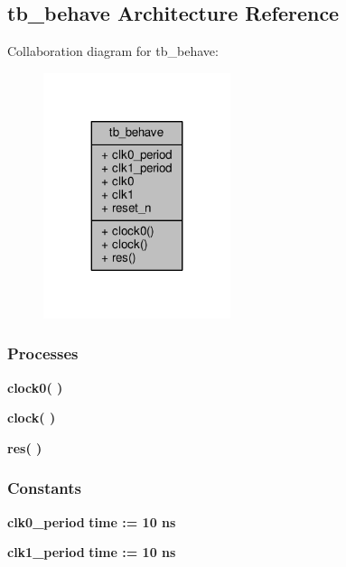 \subsection{tb\+\_\+behave Architecture Reference}
\label{classLTE__rx__path__tb_1_1tb__behave}


Collaboration diagram for tb\+\_\+behave\+:\nopagebreak
\begin{figure}[H]
\begin{center}
\leavevmode
\includegraphics[width=155pt]{d8/d33/classLTE__rx__path__tb_1_1tb__behave__coll__graph}
\end{center}
\end{figure}
\subsubsection*{Processes}
 \begin{DoxyCompactItemize}
\item 
{\bf clock0}{\bfseries  (  )}
\item 
{\bf clock}{\bfseries  (  )}
\item 
{\bf res}{\bfseries  (  )}
\end{DoxyCompactItemize}
\subsubsection*{Constants}
 \begin{DoxyCompactItemize}
\item 
{\bf clk0\+\_\+period} {\bfseries \textcolor{comment}{time}\textcolor{vhdlchar}{ }\textcolor{vhdlchar}{ }\textcolor{vhdlchar}{\+:}\textcolor{vhdlchar}{=}\textcolor{vhdlchar}{ }\textcolor{vhdlchar}{ }\textcolor{vhdlchar}{ } \textcolor{vhdldigit}{10} \textcolor{vhdlchar}{ }\textcolor{vhdlchar}{ns}\textcolor{vhdlchar}{ }} 
\item 
{\bf clk1\+\_\+period} {\bfseries \textcolor{comment}{time}\textcolor{vhdlchar}{ }\textcolor{vhdlchar}{ }\textcolor{vhdlchar}{\+:}\textcolor{vhdlchar}{=}\textcolor{vhdlchar}{ }\textcolor{vhdlchar}{ }\textcolor{vhdlchar}{ } \textcolor{vhdldigit}{10} \textcolor{vhdlchar}{ }\textcolor{vhdlchar}{ns}\textcolor{vhdlchar}{ }} 
\end{DoxyCompactItemize}
